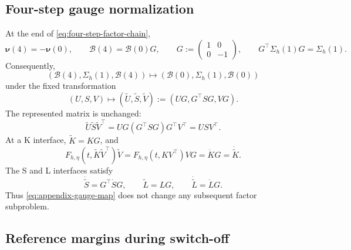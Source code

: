 \documentclass[10pt,a4paper]{amsart}
\numberwithin{equation}{section}
\begin{document}
\subsection{Four-step gauge normalization}
\label{app:four-step-gauge}

At the end of \eqref{eq:four-step-factor-chain},
\begin{equation}\label{eq:appendix-gauge-data}
 \boldsymbol\nu(4)=-\boldsymbol\nu(0),
 \qquad \mathcal B(4)=\mathcal B(0)G,
 \qquad G:=\begin{pmatrix}1&0\\0&-1\end{pmatrix},
 \qquad G^\top \Sigma_h(1)G=\Sigma_h(1).
\end{equation}
Consequently,
\begin{equation}\label{eq:appendix-gauge-cycle}
 (\mathcal B(4),\Sigma_h(1),\mathcal B(4))
 \longmapsto
 (\mathcal B(0),\Sigma_h(1),\mathcal B(0))
\end{equation}
under the fixed transformation
\begin{equation}\label{eq:appendix-gauge-map}
 (U,S,V)\longmapsto
 (\widetilde U,\widetilde S,\widetilde V)
 :=(UG,G^\top SG,VG).
\end{equation}
The represented matrix is unchanged:
\[
 \widetilde U\widetilde S\widetilde V^\top
 =UG(G^\top SG)G^\top V^\top=USV^\top.
\]
At a K interface, \(\widetilde K=KG\), and
\[
 F_{h,\eta}(t,\widetilde K\widetilde V^\top)\widetilde V
 =F_{h,\eta}(t,KV^\top)VG
 =\dot K G=\dot{\widetilde K}.
\]
The S and L interfaces satisfy
\[
 \dot{\widetilde S}=G^\top\dot S G,
 \qquad
 \widetilde L=LG,
 \qquad
 \dot{\widetilde L}=\dot L G.
\]
Thus \eqref{eq:appendix-gauge-map} does not change any subsequent
factor subproblem.

\subsection{Reference margins during switch-off}
\label{app:switch-off-margins}
\end{document}
